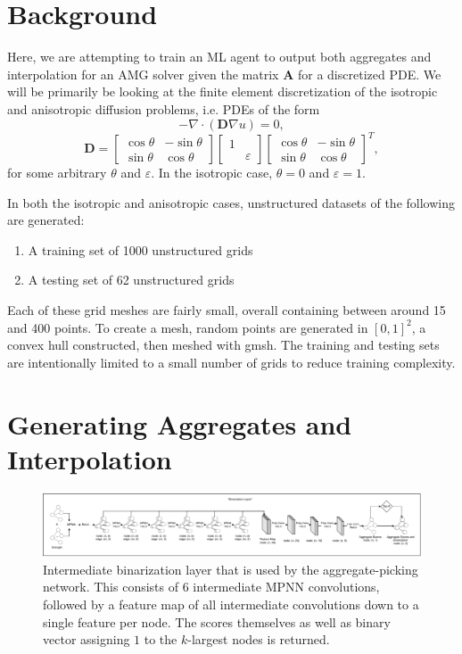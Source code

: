 \documentclass{article}
\newcommand{\mat}[1]{\bm{{#1}}}
\newcommand{\grad}{\nabla}
\begin{document}
\section{Background}
Here, we are attempting to train an ML agent to output both aggregates and interpolation for an AMG solver given the matrix $\mat{A}$ for a discretized PDE.  We will be primarily be looking at the finite element discretization of the isotropic and anisotropic diffusion problems, i.e. PDEs of the form
\begin{equation}
  -\grad \cdot \left(\mat{D} \grad u\right) = 0,
\end{equation}
\begin{equation}
  \mat{D} = \begin{bmatrix} \cos \theta & -\sin \theta \\ \sin \theta & \cos \theta \end{bmatrix} \begin{bmatrix} 1 & \\ & \varepsilon \end{bmatrix} \begin{bmatrix} \cos \theta & -\sin \theta \\ \sin \theta & \cos \theta \end{bmatrix}^T,
\end{equation}
for some arbitrary $\theta$ and $\varepsilon$.  In the isotropic case, $\theta=0$ and $\varepsilon=1$.

In both the isotropic and anisotropic cases, unstructured datasets of the following are generated:
\begin{enumerate}
\item A training set of 1000 unstructured grids
\item A testing set of 62 unstructured grids
\end{enumerate}
Each of these grid meshes are fairly small, overall containing between around 15 and 400 points.  To create a mesh, random points are generated in $\left[0,1\right]^2$, a convex hull constructed, then meshed with gmsh.  The training and testing sets are intentionally limited to a small number of grids to reduce training complexity.

\section{Generating Aggregates and Interpolation}

\begin{figure}[h]
  \centering
  \includegraphics[width=\textwidth]{binarization.pdf}
  \caption{Intermediate binarization layer that is used by the aggregate-picking network.  This consists of 6 intermediate MPNN convolutions, followed by a feature map of all intermediate convolutions down to a single feature per node.  The scores themselves as well as binary vector assigning $1$ to the $k$-largest nodes is returned.}
  \label{fig:arch_bin}
\end{figure}
\end{document}
